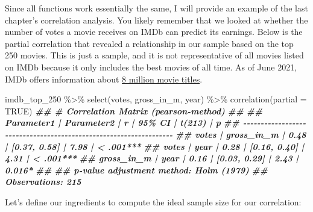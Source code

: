 \documentclass[
]{book}
\newenvironment{Shaded}{\begin{snugshade}}{\end{snugshade}}
\newcommand{\AttributeTok}[1]{\textcolor[rgb]{0.77,0.63,0.00}{#1}}
\newcommand{\ConstantTok}[1]{\textcolor[rgb]{0.00,0.00,0.00}{#1}}
\newcommand{\DocumentationTok}[1]{\textcolor[rgb]{0.56,0.35,0.01}{\textbf{\textit{#1}}}}
\newcommand{\FunctionTok}[1]{\textcolor[rgb]{0.00,0.00,0.00}{#1}}
\newcommand{\NormalTok}[1]{#1}
\newcommand{\SpecialCharTok}[1]{\textcolor[rgb]{0.00,0.00,0.00}{#1}}
\begin{document}
Since all functions work essentially the same, I will provide an example of the last chapter's correlation analysis. You likely remember that we looked at whether the number of votes a movie receives on IMDb can predict its earnings. Below is the partial correlation that revealed a relationship in our sample based on the top 250 movies. This is just a sample, and it is not representative of all movies listed on IMDb because it only includes the best movies of all time. As of June 2021, IMDb offers information about \href{https://www.imdb.com/pressroom/stats/}{8 million movie titles}.

\begin{Shaded}
\begin{Highlighting}[]
\NormalTok{imdb\_top\_250 }\SpecialCharTok{\%\textgreater{}\%} 
  \FunctionTok{select}\NormalTok{(votes, gross\_in\_m, year) }\SpecialCharTok{\%\textgreater{}\%} 
  \FunctionTok{correlation}\NormalTok{(}\AttributeTok{partial =} \ConstantTok{TRUE}\NormalTok{)}
\DocumentationTok{\#\# \# Correlation Matrix (pearson{-}method)}
\DocumentationTok{\#\# }
\DocumentationTok{\#\# Parameter1 | Parameter2 |    r |       95\% CI | t(213) |         p}
\DocumentationTok{\#\# {-}{-}{-}{-}{-}{-}{-}{-}{-}{-}{-}{-}{-}{-}{-}{-}{-}{-}{-}{-}{-}{-}{-}{-}{-}{-}{-}{-}{-}{-}{-}{-}{-}{-}{-}{-}{-}{-}{-}{-}{-}{-}{-}{-}{-}{-}{-}{-}{-}{-}{-}{-}{-}{-}{-}{-}{-}{-}{-}{-}{-}{-}{-}{-}{-}{-}}
\DocumentationTok{\#\# votes      | gross\_in\_m | 0.48 | [0.37, 0.58] |   7.98 | \textless{} .001***}
\DocumentationTok{\#\# votes      |       year | 0.28 | [0.16, 0.40] |   4.31 | \textless{} .001***}
\DocumentationTok{\#\# gross\_in\_m |       year | 0.16 | [0.03, 0.29] |   2.43 | 0.016*   }
\DocumentationTok{\#\# }
\DocumentationTok{\#\# p{-}value adjustment method: Holm (1979)}
\DocumentationTok{\#\# Observations: 215}
\end{Highlighting}
\end{Shaded}

Let's define our ingredients to compute the ideal sample size for our correlation:
\end{document}
